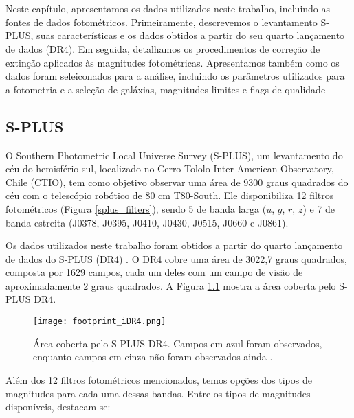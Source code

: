 \chapter{\chapternamedatabase}\label{database}

Neste capítulo, apresentamos os dados utilizados neste trabalho, incluindo as fontes de dados fotométricos. Primeiramente, descrevemos o levantamento S-PLUS, suas características e os dados obtidos a partir do seu quarto lançamento de dados (DR4). Em seguida, detalhamos os procedimentos de correção de extinção aplicados às magnitudes fotométricas. Apresentamos também como os dados foram seleiconados para a análise, incluindo os parâmetros utilizados para a fotometria e a seleção de galáxias, magnitudes limites e flags de qualidade

\section{S-PLUS}
O Southern Photometric Local Universe Survey (S-PLUS), um levantamento do céu do hemisfério sul, localizado no Cerro Tololo Inter-American Observatory, Chile (CTIO), tem como objetivo observar uma área de 9300 graus quadrados do céu com o telescópio robótico de 80 cm T80-South. Ele disponibiliza 12 filtros fotométricos (Figura \ref{splus_filters}), sendo 5 de banda larga ($u$, $g$, $r$, $z$) e 7 de banda estreita (J0378, J0395, J0410, J0430, J0515, J0660 e J0861).

Os dados utilizados neste trabalho foram obtidos a partir do quarto lançamento de dados do S-PLUS (DR4) \citep{herpich2024fourthsplusdatarelease}. O DR4 cobre uma área de 3022,7 graus quadrados, composta por 1629 campos, cada um deles com um campo de visão de aproximadamente 2 graus quadrados. A Figura \ref{footprint_iDR4} mostra a área coberta pelo S-PLUS DR4.

\begin{figure}[!ht]
    \begin{center}
    \texttt{[image: footprint\_iDR4.png]}
    \caption[]{Área coberta pelo S-PLUS DR4. Campos em azul foram observados, enquanto campos em cinza não foram observados ainda \cite{splus_DR4_footprint}.}
    \label{footprint_iDR4}
    \end{center}
\end{figure}

Além dos 12 filtros fotométricos mencionados, temos opções dos tipos de magnitudes para cada uma dessas bandas. Entre os tipos de magnitudes disponíveis, destacam-se:

